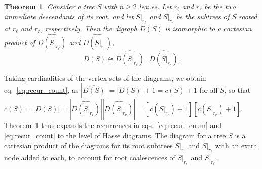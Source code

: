 \documentclass[10pt]{article}
\newcommand*{\cp}[2]{#1 \,\square\, #2}
\newtheorem{theorem}{Theorem}
\begin{document}
\begin{theorem}\label{thm:graph_decomp}
Consider a tree $S$ with $n\geq 2$ leaves. Let $r_\ell$ and $r_r$ be the two immediate descendants of its root, and let $S|_{r_\ell}$ and $S|_{r_r}$ be the subtrees of $S$ rooted at $r_\ell$ and $r_r$, respectively. Then the digraph $D(S)$ is isomorphic to a cartesian product of $\widehat{D(S|_{r_\ell})}$ and $\widehat{D(S|_{r_r})}$,
\[
	D(S) \cong \cp{\widehat{D(S|_{r_\ell})}}{\widehat{D(S|_{r_r})}}.
\]
\end{theorem}
Taking cardinalities of the vertex sets of the diagrams, we obtain eq.~\ref{eq:recur_count}, as $|\widehat{D(S)}| = |D(S)| + 1 = c(S) + 1$ for all $S$, so that $c(S) = |D(S)|= |\widehat{D(S|_{r_\ell})}| |\widehat{D(S|_{r_r})}| = \left[c(S|_{r_\ell})+1\right] \left[c(S|_{r_r})+1\right]$. Theorem~\ref{thm:graph_decomp} thus expands the recurrences in eqs.~\ref{eq:recur_enum} and \ref{eq:recur_count} to the level of Hasse diagrams. The diagram for a tree $S$ is a cartesian product of the diagrams for its root subtrees $S|_{r_r}$ and $S|_{r_\ell}$ with an extra node added to each, to account for root coalescences of $S|_{r_r}$ and $S|_{r_\ell}$.
\end{document}
